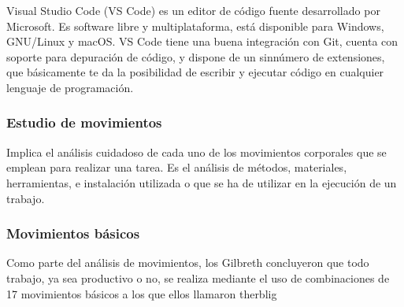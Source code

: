     Visual Studio Code (VS Code) es un editor de código fuente desarrollado por Microsoft. Es software libre y multiplataforma, está disponible para Windows, GNU/Linux y macOS. VS Code tiene una buena integración con Git, cuenta con soporte para depuración de código, y dispone de un sinnúmero de extensiones, que básicamente te da la posibilidad de escribir y ejecutar código en cualquier lenguaje de programación.\cite{OpenWebinars.net}
    
    \subsubsection{Estudio de movimientos}
    
    Implica el análisis cuidadoso de cada uno de los movimientos corporales que se emplean para realizar una tarea. 
    \cite{niebel1980ingenieria}
    Es el análisis de métodos, materiales, herramientas, e instalación utilizada o que se ha de utilizar en la ejecución de un trabajo.
    
    \subsubsection{Movimientos básicos} 
    Como parte del análisis de movimientos, los Gilbreth concluyeron que todo trabajo, ya sea productivo o no, se realiza mediante el uso de combinaciones de 17 movimientos básicos a los que ellos llamaron therblig \cite{niebel1980ingenieria}  
    
